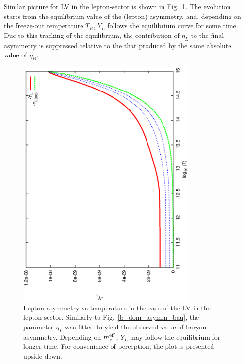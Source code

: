 \documentclass[12pt]{revtex4}
\newcommand{\meff}{m^{\rm eff}_\nu}
\begin{document}
	Similar picture for LV in the lepton-sector is shown 
	in Fig.~\ref{l_dom_asymm_bau}.
	The evolution starts from the equilibrium value of the (lepton)
	asymmetry, and, depending on the freeze-out temperature $ T_R $,
	$ Y_L $ follows the equilibrium curve for some time.
	Due to this tracking of the equilibrium, the contribution of $ \eta_L $ 
	to the final asymmetry is suppressed relative to the that produced by the same 
	absolute value of $ \eta_B $.
\begin{figure}
\includegraphics[width=9cm,angle=270]{l_dom_asymm_bau.ps}
\caption{
	Lepton asymmetry vs temperature in the case of the LV in the lepton sector.
	Similarly to Fig.~\ref{b_dom_asymm_bau}, the parameter $ \eta_L $ was fitted
	to yield the observed value of baryon asymmetry.
	Depending on $ \meff $, $ Y_L $ may follow the equilibrium for longer time.
	For convenience of perception, the plot is presented upside-down.
	}
\label{l_dom_asymm_bau}
\end{figure}
\end{document}
